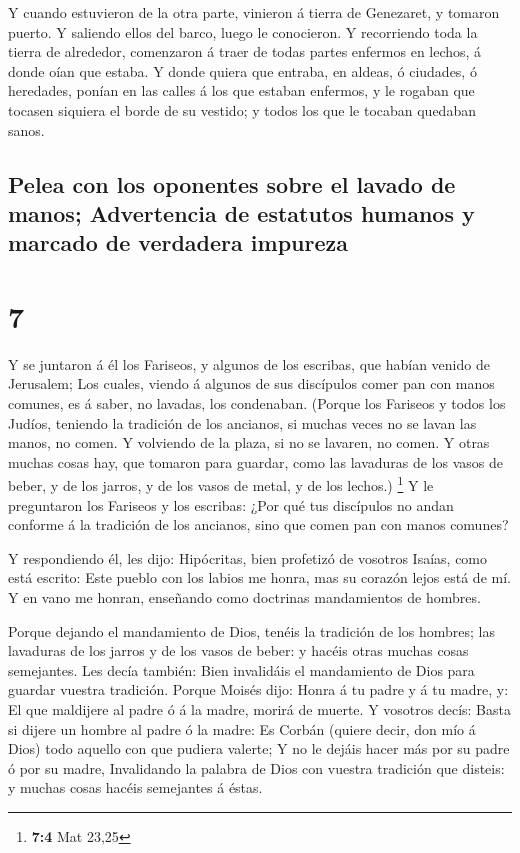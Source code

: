  Y cuando estuvieron de la otra parte, vinieron á tierra
de Genezaret, y tomaron puerto.  Y saliendo ellos del
barco, luego le conocieron.  Y recorriendo toda la tierra
de alrededor, comenzaron á traer de todas partes enfermos en lechos, á
donde oían que estaba.  Y donde quiera que entraba, en
aldeas, ó ciudades, ó heredades, ponían en las calles á los que estaban
enfermos, y le rogaban que tocasen siquiera el borde de su vestido; y
todos los que le tocaban quedaban sanos.

\hypertarget{pelea-con-los-oponentes-sobre-el-lavado-de-manos-advertencia-de-estatutos-humanos-y-marcado-de-verdadera-impureza}{%
\subsection{Pelea con los oponentes sobre el lavado de manos;
Advertencia de estatutos humanos y marcado de verdadera
impureza}\label{pelea-con-los-oponentes-sobre-el-lavado-de-manos-advertencia-de-estatutos-humanos-y-marcado-de-verdadera-impureza}}

\hypertarget{section-6}{%
\section{7}\label{section-6}}

 Y se juntaron á él los Fariseos, y algunos de los
escribas, que habían venido de Jerusalem;  Los cuales,
viendo á algunos de sus discípulos comer pan con manos comunes, es á
saber, no lavadas, los condenaban.  (Porque los Fariseos y
todos los Judíos, teniendo la tradición de los ancianos, si muchas veces
no se lavan las manos, no comen.  Y volviendo de la plaza,
si no se lavaren, no comen. Y otras muchas cosas hay, que tomaron para
guardar, como las lavaduras de los vasos de beber, y de los jarros, y de
los vasos de metal, y de los lechos.) \footnote{\textbf{7:4} Mat 23,25}
 Y le preguntaron los Fariseos y los escribas: ¿Por qué
tus discípulos no andan conforme á la tradición de los ancianos, sino
que comen pan con manos comunes?

 Y respondiendo él, les dijo: Hipócritas, bien profetizó
de vosotros Isaías, como está escrito: Este pueblo con los labios me
honra, mas su corazón lejos está de mí.  Y en vano me
honran, enseñando como doctrinas mandamientos de hombres.

 Porque dejando el mandamiento de Dios, tenéis la
tradición de los hombres; las lavaduras de los jarros y de los vasos de
beber: y hacéis otras muchas cosas semejantes.  Les decía
también: Bien invalidáis el mandamiento de Dios para guardar vuestra
tradición.  Porque Moisés dijo: Honra á tu padre y á tu
madre, y: El que maldijere al padre ó á la madre, morirá de muerte.
 Y vosotros decís: Basta si dijere un hombre al padre ó
la madre: Es Corbán (quiere decir, don mío á Dios) todo aquello con que
pudiera valerte;  Y no le dejáis hacer más por su padre ó
por su madre,  Invalidando la palabra de Dios con vuestra
tradición que disteis: y muchas cosas hacéis semejantes á éstas.

